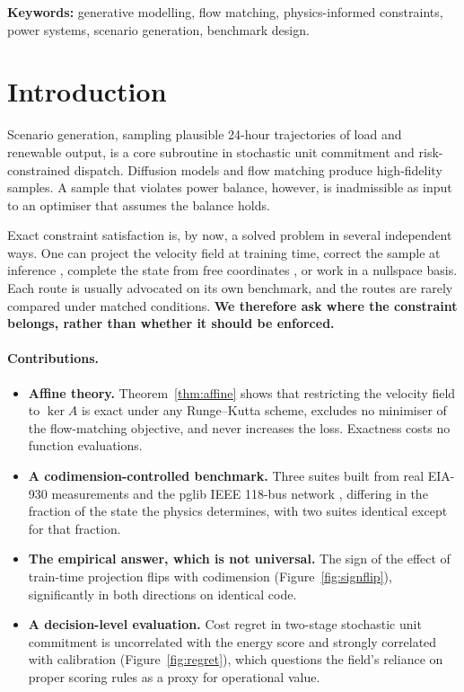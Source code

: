 \documentclass{article}
\begin{document}
\textbf{Keywords:} generative modelling, flow matching, physics-informed constraints, power systems, scenario generation, benchmark design.

\section{Introduction}\label{sec:intro}
Scenario generation, sampling plausible 24-hour trajectories of load and renewable output, is a core subroutine in stochastic unit commitment and risk-constrained dispatch. Diffusion models \citep{ho2020denoising,song2021scoresde} and flow matching \citep{lipman2023flow} produce high-fidelity samples. A sample that violates power balance, however, is inadmissible as input to an optimiser that assumes the balance holds.

Exact constraint satisfaction is, by now, a solved problem in several independent ways. One can project the velocity field at training time, correct the sample at inference \citep{utkarsh2025pcfm}, complete the state from free coordinates \citep{donti2021dc3}, or work in a nullspace basis. Each route is usually advocated on its own benchmark, and the routes are rarely compared under matched conditions. \textbf{We therefore ask where the constraint belongs, rather than whether it should be enforced.}

\paragraph{Contributions.}
\begin{itemize}
\item \textbf{Affine theory.} Theorem~\ref{thm:affine} shows that restricting the velocity field to $\ker A$ is exact under any Runge--Kutta scheme, excludes no minimiser of the flow-matching objective, and never increases the loss. Exactness costs no function evaluations.
\item \textbf{A codimension-controlled benchmark.} Three suites built from real EIA-930 measurements and the pglib IEEE 118-bus network \citep{pglib2021,zimmerman2011matpower}, differing in the fraction of the state the physics determines, with two suites identical except for that fraction.
\item \textbf{The empirical answer, which is not universal.} The sign of the effect of train-time projection flips with codimension (Figure~\ref{fig:signflip}), significantly in both directions on identical code.
\item \textbf{A decision-level evaluation.} Cost regret in two-stage stochastic unit commitment is uncorrelated with the energy score and strongly correlated with calibration (Figure~\ref{fig:regret}), which questions the field's reliance on proper scoring rules as a proxy for operational value.
\end{itemize}
\end{document}
